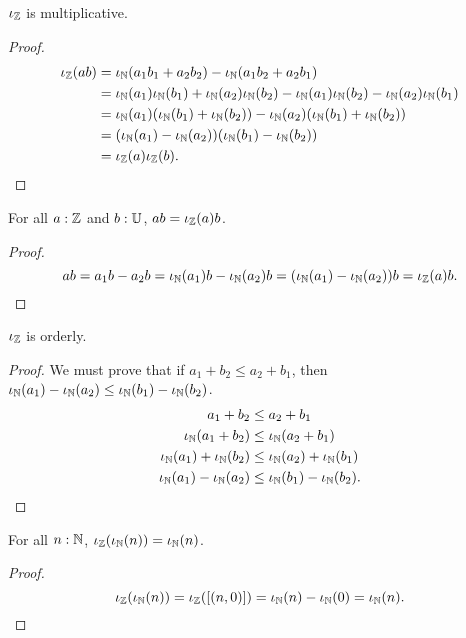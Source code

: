 \documentclass[../../math.tex]{subfiles}
\begin{document}
\begin{instance} \label{from_int_mult}
    $\iZ$ is multiplicative.
\end{instance}
\begin{proof}
    \begin{align*}
        \iZ(ab)
        &= \iN(a_1b_1 + a_2b_2) - \iN(a_1b_2 + a_2b_1) \\
        &= \iN(a_1)\iN(b_1) + \iN(a_2)\iN(b_2)
            - \iN(a_1)\iN(b_2) - \iN(a_2)\iN(b_1) \\
        &= \iN(a_1)(\iN(b_1) + \iN(b_2)) - \iN(a_2)(\iN(b_1) + \iN(b_2)) \\
        &= (\iN(a_1) - \iN(a_2)) (\iN(b_1) - \iN(b_2)) \\
        &= \iZ(a) \iZ(b).
    \end{align*}
\end{proof}

\begin{theorem}
    For all $a : \Z$ and $b : \U$, $ab = \iZ(a)b$.
\end{theorem}
\begin{proof}
    \[
        ab = a_1b - a_2b = \iN(a_1)b - \iN(a_2)b = (\iN(a_1) - \iN(a_2))b
        = \iZ(a)b.
    \]
\end{proof}

\begin{instance}
    $\iZ$ is orderly.
\end{instance}
\begin{proof}
    We must prove that if $a_1 + b_2 \leq a_2 + b_1$, then $\iN(a_1) - \iN(a_2)
    \leq \iN(b_1) - \iN(b_2)$.
    \begin{align*}
        a_1 + b_2 &\leq a_2 + b_1 \\
        \iN(a_1 + b_2) &\leq \iN(a_2 + b_1) \\
        \iN(a_1) + \iN(b_2) &\leq \iN(a_2) + \iN(b_1) \\
        \iN(a_1) - \iN(a_2) &\leq \iN(b_1) - \iN(b_2).
    \end{align*}
\end{proof}

\begin{theorem}
    For all $n : \N$, $\iZ(\iN(n)) = \iN(n)$.
\end{theorem}
\begin{proof}
    \[
        \iZ(\iN(n)) = \iZ([(n, 0)]) = \iN(n) - \iN(0) = \iN(n).
    \]
\end{proof}
\end{document}
